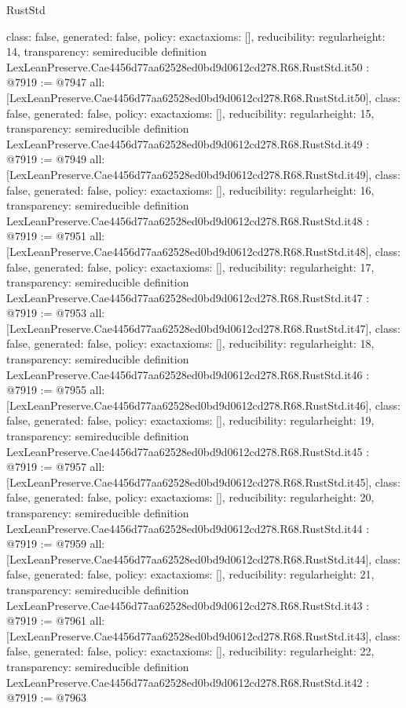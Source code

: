 \begin{lexlean}{RustStd}
\begin{coremodule}
{  class: false,
  generated: false,
  policy: exact{axioms: []},
  reducibility: regular{height: 14},
  transparency: semireducible
}
definition LexLeanPreserve.Cae4456d77aa62528ed0bd9d0612cd278.R68.RustStd.it50 : @7919 := @7947 {
  all: [LexLeanPreserve.Cae4456d77aa62528ed0bd9d0612cd278.R68.RustStd.it50],
  class: false,
  generated: false,
  policy: exact{axioms: []},
  reducibility: regular{height: 15},
  transparency: semireducible
}
definition LexLeanPreserve.Cae4456d77aa62528ed0bd9d0612cd278.R68.RustStd.it49 : @7919 := @7949 {
  all: [LexLeanPreserve.Cae4456d77aa62528ed0bd9d0612cd278.R68.RustStd.it49],
  class: false,
  generated: false,
  policy: exact{axioms: []},
  reducibility: regular{height: 16},
  transparency: semireducible
}
definition LexLeanPreserve.Cae4456d77aa62528ed0bd9d0612cd278.R68.RustStd.it48 : @7919 := @7951 {
  all: [LexLeanPreserve.Cae4456d77aa62528ed0bd9d0612cd278.R68.RustStd.it48],
  class: false,
  generated: false,
  policy: exact{axioms: []},
  reducibility: regular{height: 17},
  transparency: semireducible
}
definition LexLeanPreserve.Cae4456d77aa62528ed0bd9d0612cd278.R68.RustStd.it47 : @7919 := @7953 {
  all: [LexLeanPreserve.Cae4456d77aa62528ed0bd9d0612cd278.R68.RustStd.it47],
  class: false,
  generated: false,
  policy: exact{axioms: []},
  reducibility: regular{height: 18},
  transparency: semireducible
}
definition LexLeanPreserve.Cae4456d77aa62528ed0bd9d0612cd278.R68.RustStd.it46 : @7919 := @7955 {
  all: [LexLeanPreserve.Cae4456d77aa62528ed0bd9d0612cd278.R68.RustStd.it46],
  class: false,
  generated: false,
  policy: exact{axioms: []},
  reducibility: regular{height: 19},
  transparency: semireducible
}
definition LexLeanPreserve.Cae4456d77aa62528ed0bd9d0612cd278.R68.RustStd.it45 : @7919 := @7957 {
  all: [LexLeanPreserve.Cae4456d77aa62528ed0bd9d0612cd278.R68.RustStd.it45],
  class: false,
  generated: false,
  policy: exact{axioms: []},
  reducibility: regular{height: 20},
  transparency: semireducible
}
definition LexLeanPreserve.Cae4456d77aa62528ed0bd9d0612cd278.R68.RustStd.it44 : @7919 := @7959 {
  all: [LexLeanPreserve.Cae4456d77aa62528ed0bd9d0612cd278.R68.RustStd.it44],
  class: false,
  generated: false,
  policy: exact{axioms: []},
  reducibility: regular{height: 21},
  transparency: semireducible
}
definition LexLeanPreserve.Cae4456d77aa62528ed0bd9d0612cd278.R68.RustStd.it43 : @7919 := @7961 {
  all: [LexLeanPreserve.Cae4456d77aa62528ed0bd9d0612cd278.R68.RustStd.it43],
  class: false,
  generated: false,
  policy: exact{axioms: []},
  reducibility: regular{height: 22},
  transparency: semireducible
}
definition LexLeanPreserve.Cae4456d77aa62528ed0bd9d0612cd278.R68.RustStd.it42 : @7919 := @7963 {
}
\end{coremodule}
\end{lexlean}
